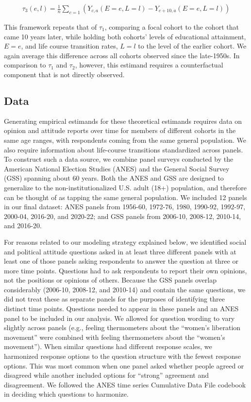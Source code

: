 \documentclass[
  12pt,
]{article}
\begin{document}
\begin{equation*}
 \begin{aligned}
   \tau_3(e,l) = \frac{1}{n}\sum_{c=1}(Y_{c,a}(E=e,L=l)-Y_{c+10,a}(E=e,L=l))
 \end{aligned}
 \end{equation*}

This framework repeats that of \(\tau_1\), comparing a focal cohort to the cohort that came 10 years later, while holding both cohorts' levels of educational attainment, \(E=e\), and life course transition rates, \(L=l\) to the level of the earlier cohort. We again average this difference across all cohorts observed since the late-1950s. In comparison to \(\tau_1\) and \(\tau_2\), however, this estimand requires a counterfactual component that is not directly observed.

\hypertarget{data}{%
\subsection{Data}\label{data}}

Generating empirical estimands for these theoretical estimands requires data on opinion and attitude reports over time for members of different cohorts in the same age ranges, with respondents coming from the same general population. We also require information about life-course transitions standardized across panels. To construct such a data source, we combine panel surveys conducted by the American National Election Studies (ANES) and the General Social Survey (GSS) spanning about 60 years. Both the ANES and GSS are designed to generalize to the non-institutionalized U.S. adult (18+) population, and therefore can be thought of as tapping the same general population. We included 12 panels in our final dataset: ANES panels from 1956-60, 1972-76, 1980, 1990-92, 1992-97, 2000-04, 2016-20, and 2020-22; and GSS panels from 2006-10, 2008-12, 2010-14, and 2016-20.

For reasons related to our modeling strategy explained below, we identified social and political attitude questions asked in at least three different panels with at least one of those panels asking respondents to answer the question at three or more time points. Questions had to ask respondents to report their own opinions, not the positions or opinions of others. Because the GSS panels overlap considerably (2006-10, 2008-12, and 2010-14) and contain the same questions, we did not treat these as separate panels for the purposes of identifying three distinct time points. Questions needed to appear in these panels and an ANES panel to be included in our analysis. We allowed for question wording to vary slightly across panels (e.g., feeling thermometers about the ``women's liberation movement'' were combined with feeling thermometers about the ``women's movement''). When similar questions had different response scales, we harmonized response options to the question structure with the fewest response options. This was most common when one panel asked whether people agreed or disagreed while another included options for ``strong'' agreement and disagreement. We followed the ANES time series Cumulative Data File codebook in deciding which questions to harmonize.
\end{document}
